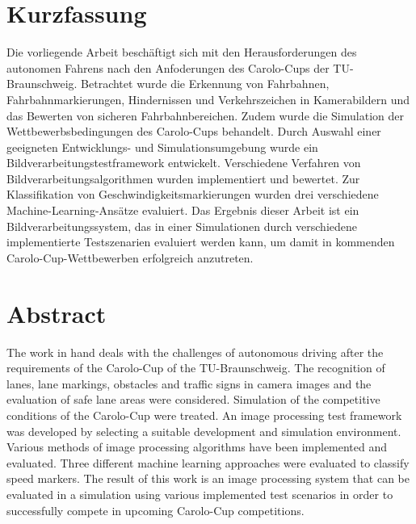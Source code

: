 
\section*{Kurzfassung} \label{Kurzfassung}
Die vorliegende Arbeit besch\"aftigt sich mit den Herausforderungen des autonomen Fahrens nach den Anfoderungen des Carolo-Cups der TU-Braunschweig. Betrachtet wurde die Erkennung von Fahrbahnen, Fahrbahnmarkierungen, Hindernissen und Verkehrszeichen in Kamerabildern und das Bewerten von sicheren Fahrbahnbereichen. Zudem wurde die Simulation der Wettbewerbsbedingungen des Carolo-Cups behandelt.
Durch Auswahl einer geeigneten Entwicklungs- und Simulationsumgebung wurde ein Bildverarbeitungstestframework entwickelt. Verschiedene Verfahren von Bildverarbeitungsalgorithmen wurden implementiert und bewertet.
Zur Klassifikation von Geschwindigkeitsmarkierungen wurden drei verschiedene Machine-Learning-Ans\"atze evaluiert.
Das Ergebnis dieser Arbeit ist ein Bildverarbeitungssystem, das in einer Simulationen durch verschiedene implementierte Testszenarien evaluiert werden kann, um damit in kommenden Carolo-Cup-Wettbewerben erfolgreich anzutreten. 


 




\newpage

\section*{Abstract} \label{Abstract}

The work in hand deals with the challenges of autonomous driving after the requirements of the Carolo-Cup of the TU-Braunschweig. The recognition of lanes, lane markings, obstacles and traffic signs in camera images and the evaluation of safe lane areas were considered. Simulation of the competitive conditions of the Carolo-Cup were treated.
An image processing test framework was developed by selecting a suitable development and simulation environment. Various methods of image processing algorithms have been implemented and evaluated.
Three different machine learning approaches were evaluated to classify speed markers.
The result of this work is an image processing system that can be evaluated in a simulation using various implemented test scenarios in order to successfully compete in upcoming Carolo-Cup competitions.






















